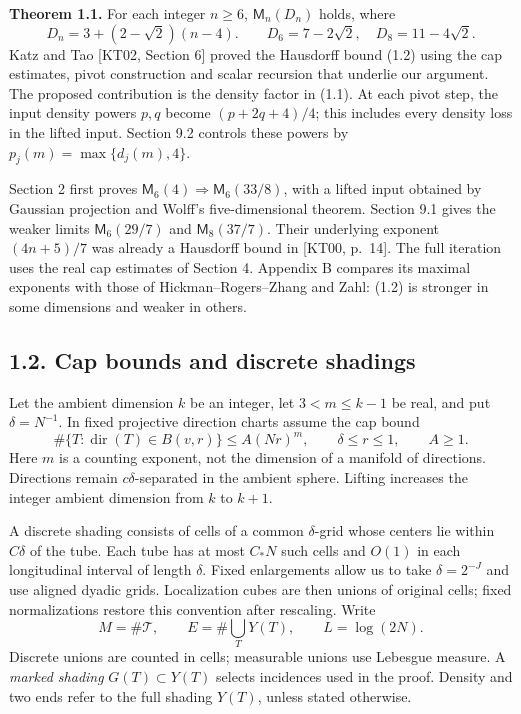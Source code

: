 \documentclass[
  11pt,
  a4paper,
]{article}
\begin{document}
\textbf{Theorem 1.1.} For each integer \(n\ge6\), \(\mathsf M_n(D_n)\)
holds, where \[
 D_n=3+(2-\sqrt2)(n-4).
 \qquad
 D_6=7-2\sqrt2,\quad D_8=11-4\sqrt2.                 \tag{1.2}\label{eq:1.2}
\] Katz and Tao {[}KT02, Section 6{]} proved the Hausdorff bound (1.2)
using the cap estimates, pivot construction and scalar recursion that
underlie our argument. The proposed contribution is the density factor
in (1.1). At each pivot step, the input density powers \(p,q\) become
\((p+2q+4)/4\); this includes every density loss in the lifted input.
Section 9.2 controls these powers by \(p_j(m)=\max\{d_j(m),4\}\).

Section 2 first proves \(\mathsf M_6(4)\Rightarrow\mathsf M_6(33/8)\),
with a lifted input obtained by Gaussian projection and Wolff's
five-dimensional theorem. Section 9.1 gives the weaker limits
\(\mathsf M_6(29/7)\) and \(\mathsf M_8(37/7)\). Their underlying
exponent \((4n+5)/7\) was already a Hausdorff bound in {[}KT00,
p.~14{]}. The full iteration uses the real cap estimates of Section 4.
Appendix B compares its maximal exponents with those of
Hickman--Rogers--Zhang and Zahl: (1.2) is stronger in some dimensions
and weaker in others.

\hypertarget{cap-bounds-and-discrete-shadings}{%
\subsection{1.2. Cap bounds and discrete
shadings}\label{cap-bounds-and-discrete-shadings}}

Let the ambient dimension \(k\) be an integer, let \(3<m\le k-1\) be
real, and put \(\delta=N^{-1}\). In fixed projective direction charts
assume the cap bound \[
 \#\{T:\operatorname{dir}(T)\in B(v,r)\}
 \le A(Nr)^m,\qquad \delta\le r\le1,
 \qquad A\ge1.                                      \tag{1.3}\label{eq:1.3}
\] Here \(m\) is a counting exponent, not the dimension of a manifold of
directions. Directions remain \(c\delta\)-separated in the ambient
sphere. Lifting increases the integer ambient dimension from \(k\) to
\(k+1\).

A discrete shading consists of cells of a common \(\delta\)-grid whose
centers lie within \(C\delta\) of the tube. Each tube has at most
\(C_*N\) such cells and \(O(1)\) in each longitudinal interval of length
\(\delta\). Fixed enlargements allow us to take \(\delta=2^{-J}\) and
use aligned dyadic grids. Localization cubes are then unions of original
cells; fixed normalizations restore this convention after rescaling.
Write \[
 M=\#\mathcal T,\qquad E=\#\bigcup_TY(T),\qquad
 L=\log(2N).
\] Discrete unions are counted in cells; measurable unions use Lebesgue
measure. A \emph{marked shading} \(G(T)\subset Y(T)\) selects incidences
used in the proof. Density and two ends refer to the full shading
\(Y(T)\), unless stated otherwise.
\end{document}
